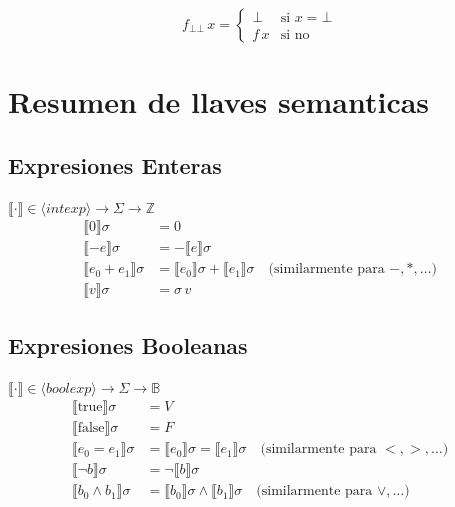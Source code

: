 \documentclass[a4paper,11pt]{article}
\begin{document}
$$f_{\bot\bot} \, x = 
\begin{cases} 
\bot & \text{si } x = \bot \\
f \, x & \text{si no}
\end{cases}$$

\section{Resumen de llaves semanticas}

\subsection*{Expresiones Enteras}
$\llbracket \cdot \rrbracket \in \langle intexp \rangle \rightarrow \Sigma \rightarrow \mathbb{Z}$
\begin{align*}
    \llbracket 0 \rrbracket \sigma &= 0 \\
    \llbracket -e \rrbracket \sigma &= -\llbracket e \rrbracket \sigma \\
    \llbracket e_0 + e_1 \rrbracket \sigma &= \llbracket e_0 \rrbracket \sigma + \llbracket e_1 \rrbracket \sigma \quad \text{(similarmente para $-, *, \dots$)} \\
    \llbracket v \rrbracket \sigma &= \sigma \, v
\end{align*}

\subsection*{Expresiones Booleanas}
$\llbracket \cdot \rrbracket \in \langle boolexp \rangle \rightarrow \Sigma \rightarrow \mathbb{B}$
\begin{align*}
    \llbracket \text{true} \rrbracket \sigma &= V \\
    \llbracket \text{false} \rrbracket \sigma &= F \\
    \llbracket e_0 = e_1 \rrbracket \sigma &= \llbracket e_0 \rrbracket \sigma = \llbracket e_1 \rrbracket \sigma \quad \text{(similarmente para $<, >, \dots$)} \\
    \llbracket \neg b \rrbracket \sigma &= \neg \llbracket b \rrbracket \sigma \\
    \llbracket b_0 \wedge b_1 \rrbracket \sigma &= \llbracket b_0 \rrbracket \sigma \wedge \llbracket b_1 \rrbracket \sigma \quad \text{(similarmente para $\vee, \dots$)}
\end{align*}
\end{document}
